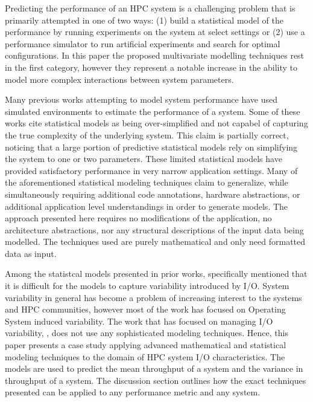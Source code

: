 \documentclass{scspaperproc}
\theoremstyle{scsthe}
\begin{document}
Predicting the performance of an HPC system is a challenging problem
that is primarily attempted in one of two ways: (1) build a
statistical model of the performance by running experiments on the
system at select settings or (2) use a performance simulator to run
artificial experiments and search for optimal configurations. In this
paper the proposed multivariate modelling techniques rest in the first
category, however they represent a notable increase in the ability to
model more complex interactions between system parameters.

Many previous works attempting to model system performance have used
simulated environments to estimate the performance of a
system. \cite{grobelny2007fase} \cite{wang2009simulation}
\cite{wang2013towards} Some of these works cite statistical models as
being over-simplified and not capabel of capturing the true complexity
of the underlying system. This claim is partially correct, noticing
that a large portion of predictive statistical models rely on
simplifying the system to one or two
parameters. \cite{snavely2002framework} \cite{bailey2005performance}
\cite{barker2009using} \cite{ye2010analyzing} These limited
statistical models have provided satisfactory performance in very
narrow application settings. Many of the aforementioned statistical
modeling techniques claim to generalize, while simultaneously
requiring additional code annotations, hardware abstractions, or
additional application level understandings in order to generate
models. The approach presented here requires no modifications of the
application, no architecture abstractions, nor any structural
descriptions of the input data being modelled. The techniques used are
purely mathematical and only need formatted data as input.

Among the statistcal models presented in prior works,
\cite{bailey2005performance} specifically mentioned that it is
difficult for the models to capture variability introduced by
I/O. System variability in general has become a problem of increasing
interest to the systems and HPC communities, however most of the work
has focused on Operating System induced variability.
\cite{beckman2008benchmarking} \cite{de2007identifying} The work that
has focused on managing I/O variability, \cite{lofstead2010managing},
does not use any sophisticated modeling techniques. Hence, this paper
presents a case study applying advanced mathematical and statistical
modeling techniques to the domain of HPC system I/O
characteristics. The models are used to predict the mean throughput of
a system and the variance in throughput of a system. The discussion
section outlines how the exact techniques presented can be applied to
any performance metric and any system.
\end{document}
